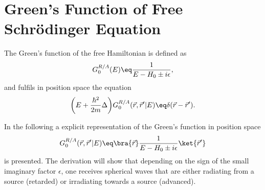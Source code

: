 \documentclass[\main/dresen_thesis.tex]{subfiles}
\begin{document}
  \section{Green's Function of Free Schr\"odinger Equation}
    \label{ch:appendix:calculations:greenFunctionFreeHamiltonian}
    The Green's function of the free Hamiltonian is defined as
    \begin{align}
      G_0^{R/A} (E) \eq \frac{1}{E - H_0 \pm i \epsilon},
    \end{align}
    and fulfils in position space the equation
    \begin{align}
      \bigg(E + \frac{\hbar^2}{2m} \Delta \bigg)G_0^{R/A}(\vec{r}, \vec{r}^\prime | E)
      \eq \delta(\vec{r} - \vec{r}^\prime).
      \label{eq:appendix:calculations:greenFunctionFreeHamiltonian:definingEquation}
    \end{align}

    In the following a explicit representation of the Green's function in position space
    \begin{align}
      G_0^{R/A}(\vec{r}, \vec{r}^\prime | E) \eq \bra{\vec{r}} \frac{1}{E - H_0 \pm i \epsilon} \ket{\vec{r}^\prime}
    \end{align}
    is presented.
    The derivation will show that depending on the sign of the small imaginary factor $\epsilon$, one receives spherical waves that are either radiating from a source (retarded) or irradiating towards a source (advanced).
\end{document}
